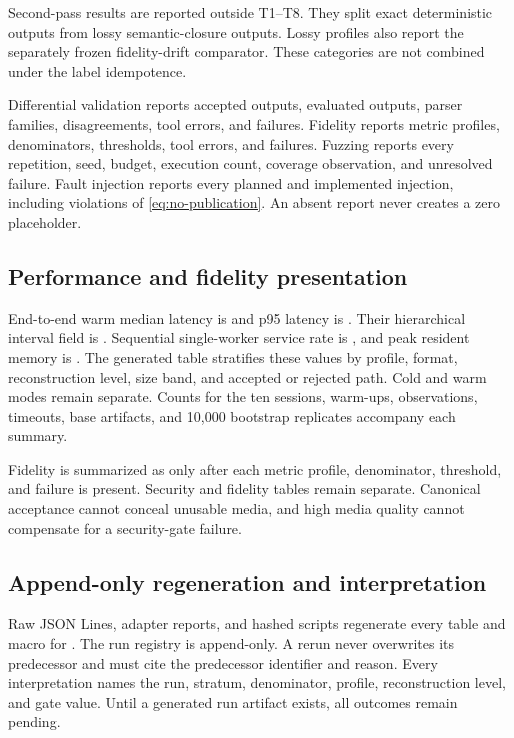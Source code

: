 Second-pass results are reported outside T1--T8. They split
\AFDExactStableOutputs exact deterministic outputs from
\AFDSemanticClosureOutputs lossy semantic-closure outputs. Lossy profiles also
report the separately frozen fidelity-drift comparator. These categories are
not combined under the label idempotence.

Differential validation reports accepted outputs, evaluated outputs, parser
families, disagreements, tool errors, and \AFDDifferentialFailures failures.
Fidelity reports metric profiles, denominators, thresholds, tool errors, and
\AFDFidelityFailures failures. Fuzzing reports every repetition, seed, budget,
execution count, coverage observation, and \AFDFuzzFailures unresolved failure.
Fault injection reports every planned and implemented injection, including
\AFDFaultFailures violations of \cref{eq:no-publication}. An absent report never
creates a zero placeholder.

\subsection{Performance and fidelity presentation}
\label{subsec:results-performance}

End-to-end warm median latency is \AFDMedianLatency and p95 latency is
\AFDPninetyfiveLatency. Their hierarchical interval field is
\AFDPerformanceCI. Sequential single-worker service rate is \AFDServiceRate,
and peak resident memory is \AFDPeakMemory. The generated table stratifies
these values by profile, format, reconstruction level, size band, and accepted
or rejected path. Cold and warm modes remain separate. Counts for the ten
sessions, warm-ups, observations, timeouts, base artifacts, and 10,000 bootstrap
replicates accompany each summary.

Fidelity is summarized as \AFDFidelitySummary only after each metric profile,
denominator, threshold, and failure is present. Security and fidelity tables
remain separate. Canonical acceptance cannot conceal unusable media, and high
media quality cannot compensate for a security-gate failure.

\subsection{Append-only regeneration and interpretation}
\label{subsec:results-regeneration}

Raw JSON Lines, adapter reports, and hashed scripts regenerate every table and
macro for \AFDRunID. The run registry is append-only. A rerun never overwrites
its predecessor and must cite the predecessor identifier and reason. Every
interpretation names the run, stratum, denominator, profile, reconstruction
level, and gate value. Until a generated run artifact exists, all outcomes
remain pending.
